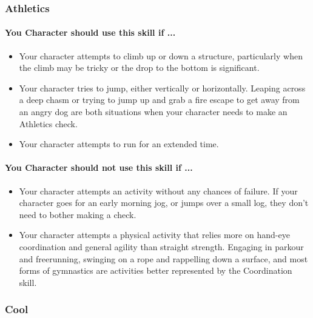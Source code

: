 \begin{multicols}{2}
\subsubsection{Athletics}\label{skill:athletics}
\paragraph{You Character should use this skill if ...}
\begin{itemize}
    \item Your character attempts to climb up or down a structure, particularly
        when the climb may be tricky or the drop to the bottom is significant.
    \item Your character tries to jump, either vertically or horizontally. Leaping
        across a deep chasm or trying to jump up and grab a fire escape to get
        away from an angry dog are both situations when your character needs to
        make an Athletics check.
    \item Your character attempts to run for an extended time.
\end{itemize}
\paragraph{You Character should not use this skill if ...}
\begin{itemize}
    \item Your character attempts an activity without any chances of failure. If
        your character goes for an early morning jog, or jumps over a small log,
        they don't need to bother making a check.
    \item Your character attempts a physical activity that relies more on hand-eye
        coordination and general agility than straight strength. Engaging in
        parkour and freerunning, swinging on a rope and rappelling down a surface,
        and most forms of gymnastics are activities better represented by the
        Coordination skill.
\end{itemize}

\subsubsection{Cool}\label{skill:cool}

\end{multicols}
